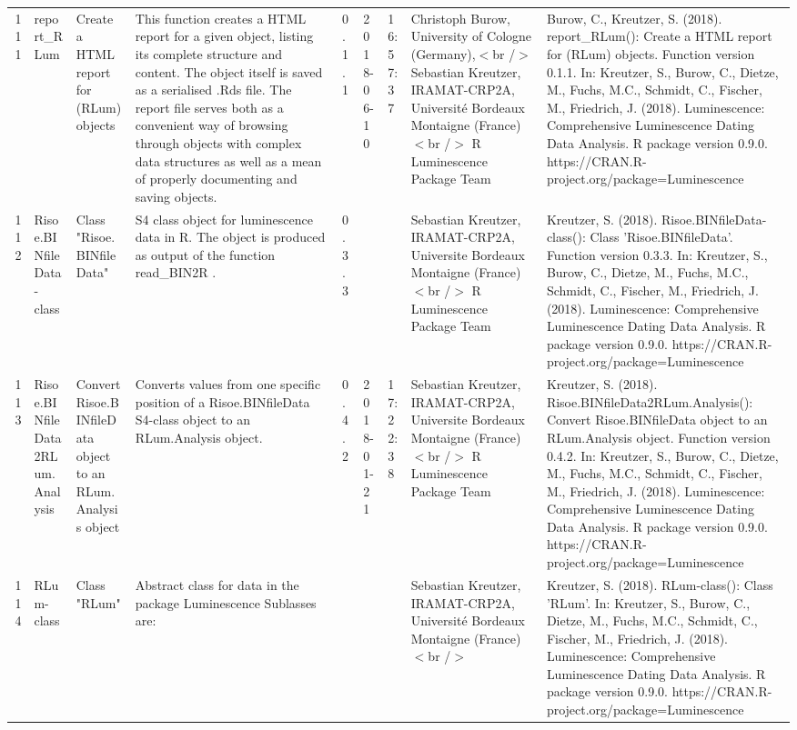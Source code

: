 \begin{table}[ht]
\begin{tabular}{rllllllll}
 \\ 
  111 & report\_RLum & Create a HTML report for (RLum) objects & This function creates a HTML report for a given object, listing its complete structure and content. The object itself is saved as a serialised .Rds file. The report file serves both as a convenient way of browsing through objects with complex data structures as well as a mean of properly documenting and saving objects. & 0.1.1 & 2018-06-10 & 16:57:37
 & Christoph Burow, University of Cologne (Germany),$<$br /$>$ Sebastian Kreutzer, IRAMAT-CRP2A, Université Bordeaux Montaigne (France)  $<$br /$>$  R Luminescence Package Team & Burow, C., Kreutzer, S. (2018). report\_RLum(): Create a HTML report for (RLum) objects. Function version 0.1.1. In: Kreutzer, S., Burow, C., Dietze, M., Fuchs, M.C., Schmidt, C., Fischer, M., Friedrich, J. (2018). Luminescence: Comprehensive Luminescence Dating Data Analysis. R package version 0.9.0. https://CRAN.R-project.org/package=Luminescence
 \\ 
  112 & Risoe.BINfileData-class & Class  "Risoe.BINfileData" & S4 class object for luminescence data in R. The object is produced as output of the function  read\_BIN2R . & 0.3.3
 &  &  & Sebastian Kreutzer, IRAMAT-CRP2A, Universite Bordeaux Montaigne (France)$<$br /$>$  R Luminescence Package Team & Kreutzer, S. (2018). Risoe.BINfileData-class(): Class 'Risoe.BINfileData'. Function version 0.3.3. In: Kreutzer, S., Burow, C., Dietze, M., Fuchs, M.C., Schmidt, C., Fischer, M., Friedrich, J. (2018). Luminescence: Comprehensive Luminescence Dating Data Analysis. R package version 0.9.0. https://CRAN.R-project.org/package=Luminescence
 \\ 
  113 & Risoe.BINfileData2RLum.Analysis & Convert Risoe.BINfileData object to an RLum.Analysis object & Converts values from one specific position of a Risoe.BINfileData S4-class object to an RLum.Analysis object. & 0.4.2 & 2018-01-21 & 17:22:38
 & Sebastian Kreutzer, IRAMAT-CRP2A, Universite Bordeaux Montaigne (France)$<$br /$>$  R Luminescence Package Team & Kreutzer, S. (2018). Risoe.BINfileData2RLum.Analysis(): Convert Risoe.BINfileData object to an RLum.Analysis object. Function version 0.4.2. In: Kreutzer, S., Burow, C., Dietze, M., Fuchs, M.C., Schmidt, C., Fischer, M., Friedrich, J. (2018). Luminescence: Comprehensive Luminescence Dating Data Analysis. R package version 0.9.0. https://CRAN.R-project.org/package=Luminescence
 \\ 
  114 & RLum-class & Class  "RLum" & Abstract class for data in the package Luminescence Sublasses are: &  &  &  & Sebastian Kreutzer, IRAMAT-CRP2A, Université Bordeaux Montaigne (France)$<$br /$>$ & Kreutzer, S. (2018). RLum-class(): Class 'RLum'. In: Kreutzer, S., Burow, C., Dietze, M., Fuchs, M.C., Schmidt, C., Fischer, M., Friedrich, J. (2018). Luminescence: Comprehensive Luminescence Dating Data Analysis. R package version 0.9.0. https://CRAN.R-project.org/package=Luminescence

\end{tabular}
\end{table}
